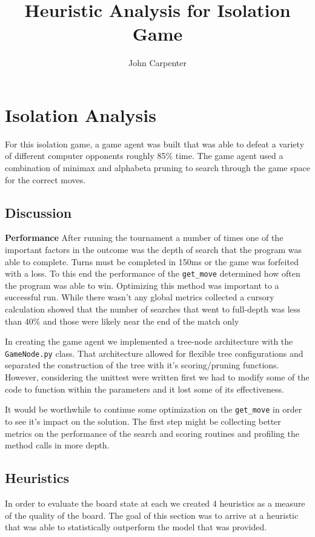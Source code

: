 \documentclass{article}
\title{Heuristic Analysis for Isolation Game}
\author{John Carpenter}
\begin{document}
\maketitle{}
\section{Isolation Analysis}
For this isolation game, a game agent was built that was able to defeat a variety of different computer opponents roughly
85\% time. The game agent used a combination of minimax and alphabeta pruning to search through
the game space for the correct moves.

\subsection{Discussion}
\textbf{Performance}\newline
After running the tournament a number of times one of the important factors in the outcome was the depth of search that
the program was able to complete. Turns must be completed in 150ms or the game was forfeited with a loss. To this end the performance of the \verb|get_move| determined how often the program was able to win. Optimizing this method was important to a successful run.
While there wasn't any global metrics collected a cursory calculation showed that the number of searches that went to full-depth was less than 40\% and those were likely near the end of the match only\newline

In creating the game agent we implemented a tree-node architecture with the \verb|GameNode.py| class. That architecture allowed
for flexible tree configurations and separated the construction of the tree with it's scoring/pruning functions. However, considering the unittest were written first we had to modify some of the
code to function within the parameters and it lost some of its effectiveness.\newline

It would be worthwhile to continue some optimization on the \verb|get_move| in order to see it's impact on the solution.
The first step might be collecting better metrics on the performance of the search and scoring routines and profiling the method calls in more depth.


\subsection{Heuristics}
In order to evaluate the board state at each we created 4 heuristics as a measure of the quality of the board. The
goal of this section was to arrive at a heuristic that was able to statistically outperform the \texttt{}
model that was provided.\newline
\end{document}
